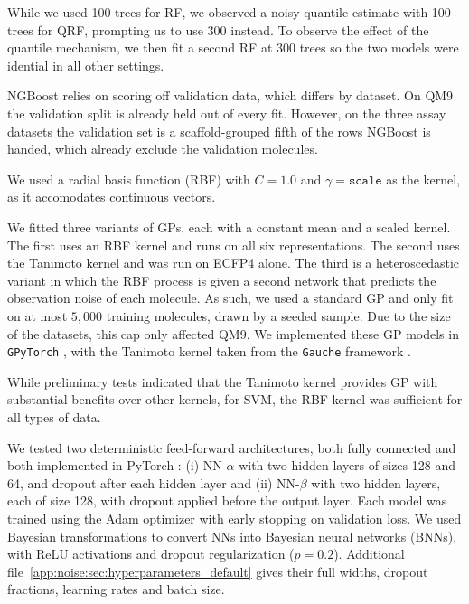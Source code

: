 While we used 100 trees for RF, we observed a noisy quantile estimate with 100 trees for QRF, prompting us to use 300 instead. To observe the effect of the quantile mechanism, we then fit a second RF at 300 trees so the two models were idential in all other settings.

NGBoost relies on scoring off validation data, which differs by dataset. On QM9 the validation split is already held out of every fit. However, on the three assay datasets the validation set is a scaffold-grouped fifth of the rows NGBoost is handed, which already exclude the validation molecules.

We used a radial basis function (RBF) with $C = 1.0$ and $\gamma = \texttt{scale}$ as the kernel, as it accomodates continuous vectors.

We fitted three variants of GPs, each with a constant mean and a scaled kernel. The first uses an RBF kernel and runs on all six representations. The second uses the Tanimoto kernel \citep{Ralaivola2005, moss2020} and was run on ECFP4 alone. The third is a heteroscedastic variant in which the RBF process is given a second network that predicts the observation noise of each molecule. As such, we used a standard GP and only fit on at most $5{,}000$ training molecules, drawn by a seeded sample. Due to the size of the datasets, this cap only affected QM9. We implemented these GP models in \texttt{GPyTorch} \citep{gpytorch}, with the Tanimoto kernel taken from the \texttt{Gauche} framework \citep{gauche}.

While preliminary tests indicated that the Tanimoto kernel provides GP with substantial benefits over other kernels, for SVM, the RBF kernel was sufficient for all types of data.

We tested two deterministic feed-forward architectures, both fully connected and both implemented in PyTorch \citep{pytorchGeometric}: (i) NN-$\alpha$ with two hidden layers of sizes 128 and 64, and dropout after each hidden layer and (ii) NN-$\beta$ with two hidden layers, each of size 128, with dropout applied before the output layer. Each model was trained using the Adam optimizer with early stopping on validation loss. We used Bayesian transformations to convert NNs into Bayesian neural networks (BNNs), with ReLU activations and dropout regularization ($p=0.2$). Additional file~\ref{app:noise:sec:hyperparameters_default} gives their full widths, dropout fractions, learning rates and batch size.

